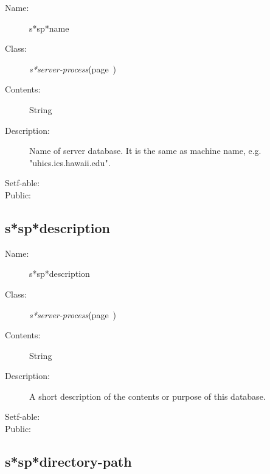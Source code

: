 \begin{description}

\item [Name:]  s*sp*name

\item [Class:] {\sl s*server-process}\hfill(page~\pageref{s*server-process})

\item [Contents:] String 

\item [Description:]  
Name of server database. It is the same as machine name,
e.g. "uhics.ics.hawaii.edu".

\item [Setf-able:] 

\item [Public:]



\end{description}
\horizontalline

\subsection{s*sp*description}
\label{s*sp*description}

\begin{description}
\item [Name:]  s*sp*description

\item [Class:] {\sl s*server-process}\hfill(page~\pageref{s*server-process})

\item [Contents:] String

\item [Description:]

A short description of the contents or purpose of 
this database.

\item [Setf-able:]


\item [Public:]



\end{description}
\horizontalline

\subsection{s*sp*directory-path}
\label{s*sp*directory-path}

